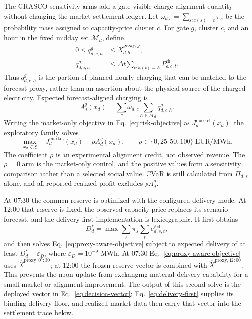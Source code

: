 \documentclass[11pt,a4paper]{article}
\begin{document}
The GRASCO sensitivity arms add a gate-visible charge-alignment quantity without
changing the market settlement ledger.  Let
$\omega_{d,c}=\sum_{s:c(s)=c}\pi_s$ be the probability mass assigned to
capacity-price cluster $c$.  For gate $g$, cluster $c$, and an hour in the
fixed midday set $\mathcal M_d$, define
\begin{align}
  0\leq q^{g}_{d,c,h}
  &\leq \widehat X^{\mathrm{proxy},g}_{d,h},
  \label{eq:forecast-overlap-proxy-bound}\\
  q^{g}_{d,c,h}
  &\leq \Delta t\sum_{t:h(t)=h}P^{\mathrm{ch}}_{d,c,t}.
  \label{eq:forecast-overlap-charge-bound}
\end{align}
Thus $q^{g}_{d,c,h}$ is the portion of planned hourly charging that can be
matched to the forecast proxy, rather than an assertion about the physical
source of the charged electricity.  Expected forecast-aligned charging is
\begin{equation}
  A^{g}_d(x_d)
  =\sum_c\omega_{d,c}\sum_{h\in\mathcal M_d}q^{g}_{d,c,h}.
  \label{eq:forecast-alignment-objective}
\end{equation}
Writing the market-only objective in Eq.~\eqref{eq:risk-objective} as
$J^{\mathrm{market}}_d(x_d)$, the exploratory family solves
\begin{equation}
  \max_{x_d,\zeta,\xi}\quad
  J^{\mathrm{market}}_d(x_d)+\rho A^g_d(x_d),
  \qquad \rho\in\{0,25,50,100\}\ \mathrm{EUR/MWh}.
  \label{eq:proxy-aware-objective}
\end{equation}
The coefficient $\rho$ is an experimental alignment credit, not observed
revenue.  The $\rho=0$ arm is the market-only control, and the positive values
form a sensitivity comparison rather than a selected social value.  CVaR is
still calculated from $\Pi_{d,s}$ alone, and all reported realized profit
excludes $\rho A^g_d$.

At 07:30 the common reserve is optimized with the configured delivery mode.
At 12:00 that reserve is fixed, the observed capacity price replaces its
scenario forecast, and the delivery-first implementation is lexicographic.  It
first obtains
\begin{equation}
  D_d^*=\max\sum_s\pi_s\sum_t e^{\mathrm{del}}_{d,s,t},
  \label{eq:delivery-first}
\end{equation}
and then solves Eq.~\eqref{eq:proxy-aware-objective} subject to expected delivery of
at least $D_d^*-\varepsilon_D$, where $\varepsilon_D=10^{-9}$ MWh.  At 07:30
Eq.~\eqref{eq:proxy-aware-objective} uses
$\widehat X^{\mathrm{proxy},07{:}30}$; at 12:00 the frozen reserve vector is
combined with $\widehat X^{\mathrm{proxy},12{:}00}$.  This
prevents the noon update from exchanging material delivery capability for a
small market or alignment improvement.  The output of this second solve is the deployed
vector in Eq.~\eqref{eq:decision-vector}; Eq.~\eqref{eq:delivery-first}
supplies its binding delivery floor, and realized market data then carry that
vector into the settlement trace below.
\end{document}

